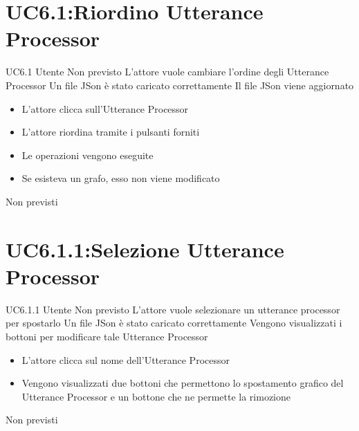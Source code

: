 \documentclass[../AnalisideiRequisiti.tex]{subfiles}
\begin{document}
\section{UC6.1:Riordino Utterance Processor}
\UserCase
{UC6.1}
{Utente}
{Non previsto}
{L'attore vuole cambiare l'ordine degli Utterance Processor}
{Un file JSon è stato caricato  correttamente }
{Il file JSon viene aggiornato}
{
	\begin{itemize}
		\item{} L'attore clicca sull'Utterance Processor 
		\item{} L'attore riordina tramite i pulsanti forniti	
		\item{} Le operazioni vengono eseguite
		\item{} Se esisteva un grafo, esso non viene modificato
		
	\end{itemize}
}
{Non previsti}
\section{UC6.1.1:Selezione Utterance Processor}
\UserCase
{UC6.1.1}
{Utente}
{Non previsto}
{L'attore vuole selezionare un utterance processor per spostarlo}
{Un file JSon è stato caricato  correttamente }
{Vengono visualizzati i bottoni per modificare tale Utterance Processor}
{
	\begin{itemize}
		\item{} L'attore clicca sul nome dell'Utterance Processor
		\item{} Vengono visualizzati due bottoni che permettono lo spostamento grafico del Utterance Processor e un bottone che ne permette la rimozione 
		
		
	\end{itemize}
}
{Non previsti}
\end{document}
